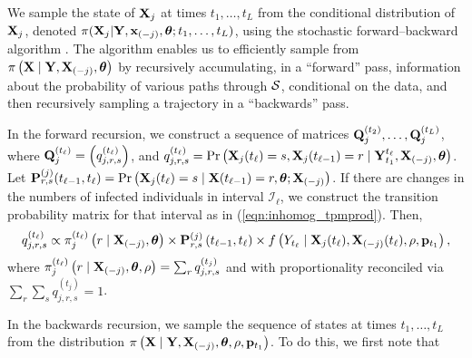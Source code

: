 We sample the state of $ \mathbf{X}_j $ at times $ t_1,\dots,t_L $ from the conditional distribution of $ \mathbf{X}_j $, denoted $ \pi(\mathbf{X}_j | \mathbf{Y},\mathbf{x}_{(-j)}, \boldsymbol{\theta}; t_1,\dots,t_L) $, using the stochastic forward--backward algorithm \cite{scott2002}. The algorithm enables us to efficiently sample from $ \pi\left (\mathbf{X} \mid \mathbf{Y}, \mathbf{X}_{(-j)}, \boldsymbol{\theta}\right ) $ by recursively accumulating, in a ``forward'' pass, information about the probability of various paths through $ \mathcal{S} $, conditional on the data, and then recursively sampling a trajectory in a ``backwards'' pass. 

In the forward recursion, we construct a sequence of matrices $ \mathbf{Q}^{(t_2)}_j,\dots,\mathbf{Q}^{(t_L)}_j $, where $ \mathbf{Q}^{(t_\ell)}_j = \left (q_{j,r,s}^{(t_\ell)}\right )$, and $ q_{j,r,s}^{(t_\ell)} = \Pr\left (\mathbf{X}_j(t_\ell) = s, \mathbf{X}_j(t_{\ell - 1}) = r \mid \mathbf{Y}_{t_1}^{t_{\ell}},\mathbf{X}_{(-j)},\boldsymbol{\theta} \right )$. Let $ \mathbf{P}^{(j)}_{r,s}(t_{\ell - 1},t_\ell) = \Pr\left (\mathbf{X}_j(t_\ell) = s \mid \mathbf{X}(t_{\ell-1})=r, \boldsymbol{\theta}; \mathbf{X}_{(-j)}\right ) $. If there are changes in the numbers of infected individuals in interval $ \mathcal{I}_\ell $, we construct the transition probability matrix for that interval as in (\ref{eqn:inhomog_tpmprod}). Then, 
\begin{equation}
q_{j,r,s}^{(t_\ell)} \propto \pi_{j}^{(t_\ell)}\left (r \mid \mathbf{X}_{(-j)}, \boldsymbol{\theta}\right ) \times \mathbf{P}^{(j)}_{r,s}\left (t_{\ell-1},t_\ell\right ) \times f\left (Y_{t_\ell} \mid \mathbf{X}_j(t_\ell),\mathbf{X}_{(-j)}(t_\ell), \rho, \mathbf{p}_{t_1}\right ),	
\end{equation}
where $  \pi_{j}^{(t_\ell)}\left (r \mid \mathbf{X}_{(-j)}, \boldsymbol{\theta}, \rho\right ) = \sum_r q_{j,r,s}^{(t_j)}$ and with proportionality reconciled via $ \sum_r\sum_s q_{j,r,s}^{(t_j)}=1 $.

In the backwards recursion, we sample the sequence of states at times $ t_1,\dots,t_L $ from the distribution $ \pi\left (\mathbf{X} \mid \mathbf{Y}, \mathbf{X}_{(-j)},\boldsymbol{\theta}, \rho,\mathbf{p}_{t_1}\right )$. To do this, we first note that\vspace{-0.25in}


